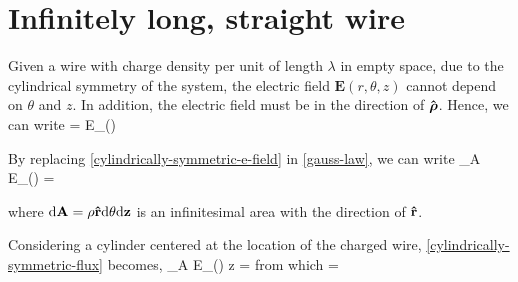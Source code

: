\section{Infinitely long, straight wire}
Given a wire with charge density per unit of length $\lambda$ in empty space, due to the cylindrical symmetry of the system, the electric 
field $\mathbf{E}(r,\theta,z)$ cannot depend on $\theta$ and $z$. In addition, the electric field must be in the direction of $\boldsymbol{\hat{\textbf{$\mathrm\rho$}}}$. 
Hence, we can write
\be\label{cylindrically-symmetric-e-field}
 = E_{\rho}(\rho) \cdot {}
\ee

By replacing \ref{cylindrically-symmetric-e-field} in \ref{gauss-law}, we can write
\be\label{cylindrically-symmetric-flux}
\oiint_A E_{\rho}(\rho) \cdot {} \cdot {} =
\ee

where $\mathrm{d}\mathbf{A} =  \rho\boldsymbol{\hat{\textbf{$\mathrm r$}}}\mathrm{d}\mathbf{\theta} \mathrm{d}\mathbf{z}$ is an infinitesimal area with the direction of $\boldsymbol{\hat{\textbf{$\mathrm r$}}}$.

Considering a cylinder centered at the location of the charged wire, \ref{cylindrically-symmetric-flux} becomes,
\be\label{cylindrically-symmetric-flux-2}
\oiint_A E_{\rho}(\rho) \cdot \rho {}\theta{}z \cdot{} =
\ee
from which
\be
{}=
\ee
